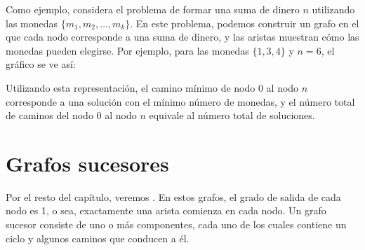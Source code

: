 Como ejemplo, considera el problema de formar una suma de dinero $n$
utilizando las monedas $\{m_1,m_2,\ldots,m_k\}$. En este problema,
podemos construir un grafo en el que cada nodo corresponde a una suma
de dinero, y las aristas muestran cómo las monedas pueden elegirse.
Por ejemplo, para las monedas $\{1,3,4\}$ y $n=6$, el gráfico se ve así:
\begin{center}
\end{center}

Utilizando esta representación, el camino mínimo de nodo 0 al nodo $n$
corresponde a una solución con el mínimo número de monedas, y el
número total de caminos del nodo 0 al nodo $n$ equivale al número
total de soluciones.

\section{Grafos sucesores}


Por el resto del capítulo, veremos . En estos
grafos, el grado de salida de cada nodo es 1, o sea, exactamente una
arista comienza en cada nodo. Un grafo sucesor consiste de uno o más
componentes, cada uno de los cuales contiene un ciclo y algunos caminos
que conducen a él.

